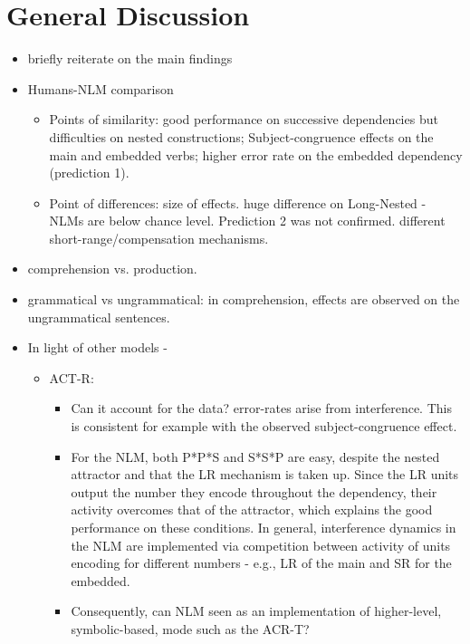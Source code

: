 \section{General Discussion}

\begin{itemize}
    \item briefly reiterate on the main findings 
    \item Humans-NLM comparison 
    \begin{itemize}
        \item Points of similarity: good performance on successive dependencies but difficulties on nested constructions; Subject-congruence effects on the main and embedded verbs; higher error rate on the embedded dependency (prediction 1). 
        \item Point of differences: size of effects. huge difference on Long-Nested - NLMs are below chance level. Prediction 2 was not confirmed. different short-range/compensation mechanisms.
    \end{itemize}
    
    \item comprehension vs. production.
    
    \item grammatical vs ungrammatical: in comprehension, effects are observed on the ungrammatical sentences. 
      
    \item In light of other models -
    \begin{itemize}
        \item ACT-R:
        \begin{itemize}    
             \item Can it account for the data? error-rates arise from interference. This is consistent for example with the observed subject-congruence effect. 
             \item For the NLM, both P*P*S and S*S*P are easy, despite the nested attractor and that the LR mechanism is taken up. Since the LR units output the number they encode throughout the dependency, their activity overcomes that of the attractor, which explains the good performance on these conditions. In general, interference dynamics in the NLM are implemented via competition between activity of units encoding for different numbers - e.g., LR of the main and SR for the embedded. 
             \item Consequently, can NLM seen as an implementation of higher-level, symbolic-based, mode such as the ACR-T?
        \end{itemize}
        

\end{itemize}
\end{itemize}
